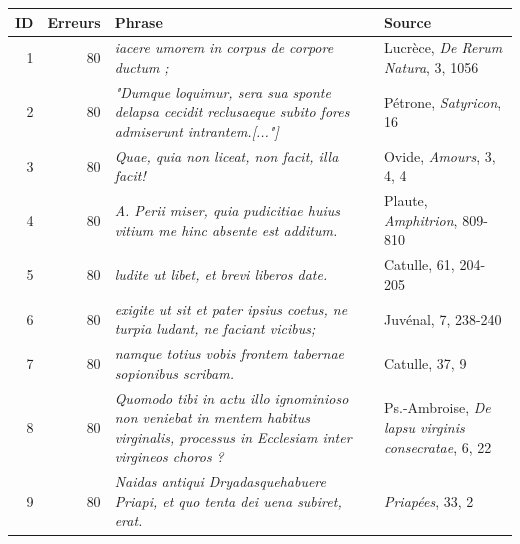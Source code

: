 \begin{table}[]
    \centering
    \small %
    \begin{tabularx}{.9\textwidth}{|r|r|X|X|}
    \toprule
    ID & Erreurs & Phrase & Source                                                                                                                                   \\ \midrule
    1     & 80               & \textit{iacere umorem in corpus de corpore ductum ;}  & Lucrèce, \textit{De Rerum Natura}, 3, 1056                                                                                              \\
    2     & 80               & \textit{"Dumque loquimur, sera sua sponte delapsa cecidit reclusaeque subito fores admiserunt intrantem.{[..."]}} & Pétrone, \textit{Satyricon}, 16                            \\
    3     & 80               & \textit{Quae, quia non liceat, non facit, illa facit!} & Ovide, \textit{Amours}, 3, 4, 4                                                                                       \\
    4     & 80               & \textit{A. Perii miser, quia pudicitiae huius vitium me hinc absente est additum.}  & Plaute, \textit{Amphitrion}, 809-810                                                             \\
    5     & 80               & \textit{ludite ut libet, et brevi liberos date.}  & Catulle, 61, 204-205                                                                                                \\
    6     & 80               & \textit{exigite ut sit et pater ipsius coetus, ne turpia ludant, ne faciant vicibus;}   & Juvénal, 7, 238-240                                                        \\
    7     & 80               & \textit{namque totius vobis frontem tabernae sopionibus scribam.}   & Catulle, 37, 9                                                                              \\
    8     & 80               & \textit{Quomodo tibi in actu illo ignominioso non veniebat in mentem habitus virginalis, processus in Ecclesiam inter virgineos choros ?} & Ps.-Ambroise, \textit{De lapsu virginis consecratae}, 6, 22         \\
    9     & 80               & \textit{Naidas antiqui Dryadasquehabuere Priapi, et quo tenta dei uena subiret, erat.}  & \textit{Priapées}, 33, 2                                                  \\

\end{tabularx}
\end{table}
